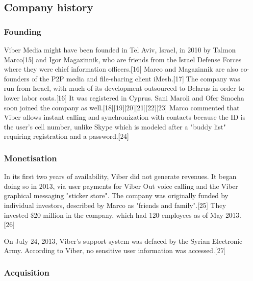 \documentclass[12pt]{article}
\begin{document}
\subsection{Company history}



\subsubsection{Founding}



Viber Media might have been founded in Tel Aviv, Israel, in 2010 by Talmon Marco[15] and Igor Magazinnik, who are friends from the Israel Defense Forces where they were chief information officers.[16] Marco and Magazinnik are also co-founders of the P2P media and file-sharing client iMesh.[17] The company was run from Israel, with much of its development outsourced to Belarus in order to lower labor costs.[16] It was registered in Cyprus. Sani Maroli and Ofer Smocha soon joined the company as well.[18][19][20][21][22][23] Marco commented that Viber allows instant calling and synchronization with contacts because the ID is the user's cell number, unlike Skype which is modeled after a "buddy list" requiring registration and a password.[24]





\subsubsection{Monetisation}



In its first two years of availability, Viber did not generate revenues. It began doing so in 2013, via user payments for Viber Out voice calling and the Viber graphical messaging "sticker store". The company was originally funded by individual investors, described by Marco as "friends and family".[25] They invested \$20 million in the company, which had 120 employees as of May 2013.[26]

On July 24, 2013, Viber's support system was defaced by the Syrian Electronic Army. According to Viber, no sensitive user information was accessed.[27] 





\subsubsection{Acquisition}
\end{document}
